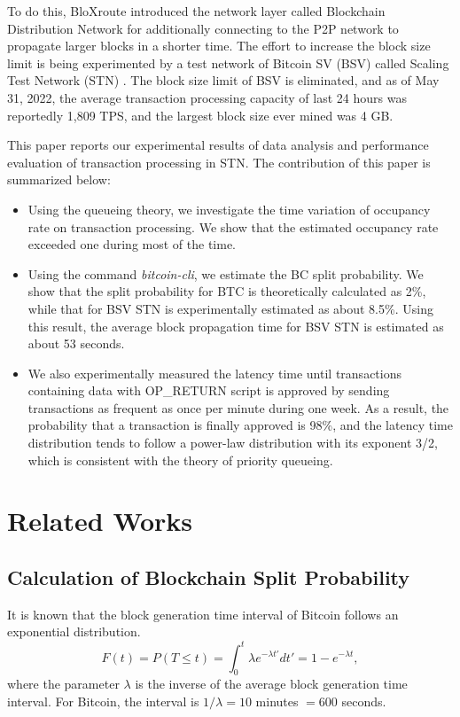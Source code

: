 \documentclass[graybox]{svmult}
\begin{document}
To do this, BloXroute\cite{bloX} introduced the network layer called Blockchain Distribution Network for additionally connecting to the P2P network to propagate larger blocks in a shorter time. 
The effort to increase the block size limit is being experimented by a test network of Bitcoin SV (BSV) \cite{bsv} called Scaling Test Network (STN) \cite{bitcoinscaling}.
The block size limit of BSV is eliminated, and 
as of May 31, 2022, the average transaction processing capacity of last 24 hours was reportedly 1,809 TPS, and the largest block size ever mined was 4 GB. 


This paper reports our experimental results of data analysis and performance evaluation of transaction processing in STN. 
The contribution of this paper is summarized below: 
%
\begin{itemize}
  \item Using the queueing theory, we investigate the time variation of occupancy rate on transaction processing. 
	We show that the estimated occupancy rate exceeded one during most of the time. 
\item Using the command \textit{bitcoin-cli}, we estimate the BC split probability. 
	We show that the split probability for BTC is theoretically calculated as 2\%, while that for BSV STN is experimentally estimated as about 8.5\%.
	Using this result, the average block propagation time for BSV STN is estimated as about 53 seconds. 
  \item We also experimentally measured the latency time until transactions containing data with OP\_RETURN script is approved by sending transactions as frequent as once per minute during one week. 
	As a result, the probability that a transaction is finally approved is 98\%, and the latency time distribution tends to follow a power-law distribution with its exponent 3/2, which is consistent with the theory of priority queueing. 
\end{itemize}
%




\section{Related Works}
\label{sec:rworks}

\subsection{Calculation of Blockchain Split Probability}
\label{sec:fork}

It is known that the block generation time interval of Bitcoin follows an exponential distribution. 
%
\begin{equation}
	F(t) = P(T \le t) = \int_{0}^{t} \lambda e^{-\lambda t'} dt' = 1 - e^{-\lambda t}, \label{eq:exp}
\end{equation}
where the parameter $\lambda$ is the inverse of the average block generation time interval.
For Bitcoin, the interval is $1 / \lambda = 10$ minutes $= 600$ seconds.
\end{document}
